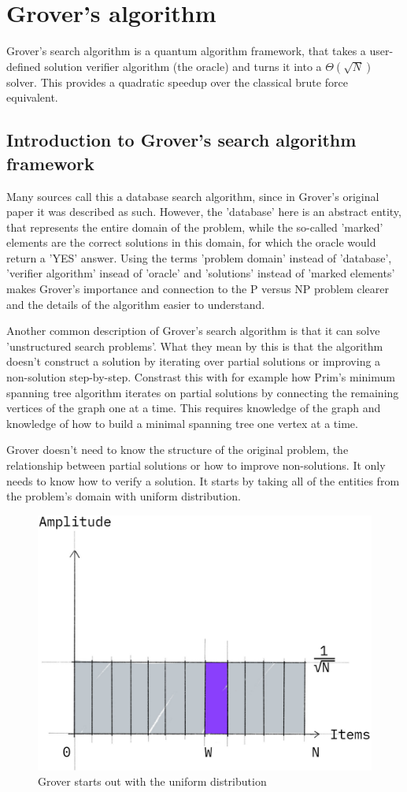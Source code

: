 \chapter{Grover's algorithm}

Grover's search algorithm\cite{GroverOriginal} is a quantum algorithm framework, that takes a user-defined solution verifier algorithm (the oracle) and turns it into a $\Theta(\sqrt{N})$\cite{bennett_strengths_1997} solver. This provides a quadratic speedup over the classical brute force equivalent.

\section{Introduction to Grover's search algorithm framework}

Many sources call this a database search algorithm, since in Grover's original paper it was described as such. However, the 'database' here is an abstract entity, that represents the entire domain of the problem, while the so-called 'marked' elements are the correct solutions in this domain, for which the oracle would return a 'YES' answer. Using the terms 'problem domain' instead of 'database', 'verifier algorithm' insead of 'oracle' and 'solutions' instead of 'marked elements' makes Grover's importance and connection to the P versus NP problem clearer and the details of the algorithm easier to understand.

Another common description of Grover's search algorithm is that it can solve 'unstructured search problems'. What they mean by this is that the algorithm doesn't construct a solution by iterating over partial solutions or improving a non-solution step-by-step. Constrast this with for example how Prim's minimum spanning tree algorithm iterates on partial solutions by connecting the remaining vertices of the graph one at a time. This requires knowledge of the graph and knowledge of how to build a minimal spanning tree one vertex at a time.

Grover doesn't need to know the structure of the original problem, the relationship between partial solutions or how to improve non-solutions. It only needs to know how to verify a solution. It starts by taking all of the entities from the problem's domain with uniform distribution.

\begin{figure}[H]
    \centering
    \includegraphics[width=0.5\linewidth]{content/assets/03_grovers_algorithm/grover_uniform.jpg}
    \caption{Grover starts out with the uniform distribution}
\end{figure}

